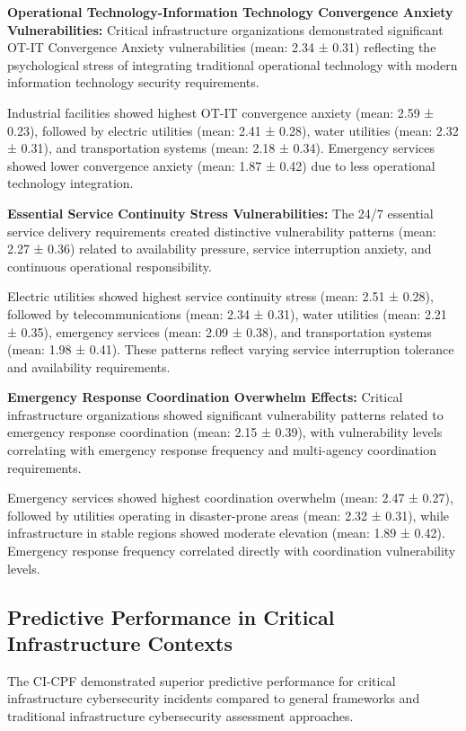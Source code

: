 \documentclass[10pt, twocolumn]{article}
\begin{document}
\textbf{Operational Technology-Information Technology Convergence Anxiety Vulnerabilities:} Critical infrastructure organizations demonstrated significant OT-IT Convergence Anxiety vulnerabilities (mean: 2.34 ± 0.31) reflecting the psychological stress of integrating traditional operational technology with modern information technology security requirements.

Industrial facilities showed highest OT-IT convergence anxiety (mean: 2.59 ± 0.23), followed by electric utilities (mean: 2.41 ± 0.28), water utilities (mean: 2.32 ± 0.31), and transportation systems (mean: 2.18 ± 0.34). Emergency services showed lower convergence anxiety (mean: 1.87 ± 0.42) due to less operational technology integration.

\textbf{Essential Service Continuity Stress Vulnerabilities:} The 24/7 essential service delivery requirements created distinctive vulnerability patterns (mean: 2.27 ± 0.36) related to availability pressure, service interruption anxiety, and continuous operational responsibility.

Electric utilities showed highest service continuity stress (mean: 2.51 ± 0.28), followed by telecommunications (mean: 2.34 ± 0.31), water utilities (mean: 2.21 ± 0.35), emergency services (mean: 2.09 ± 0.38), and transportation systems (mean: 1.98 ± 0.41). These patterns reflect varying service interruption tolerance and availability requirements.

\textbf{Emergency Response Coordination Overwhelm Effects:} Critical infrastructure organizations showed significant vulnerability patterns related to emergency response coordination (mean: 2.15 ± 0.39), with vulnerability levels correlating with emergency response frequency and multi-agency coordination requirements.

Emergency services showed highest coordination overwhelm (mean: 2.47 ± 0.27), followed by utilities operating in disaster-prone areas (mean: 2.32 ± 0.31), while infrastructure in stable regions showed moderate elevation (mean: 1.89 ± 0.42). Emergency response frequency correlated directly with coordination vulnerability levels.

\subsection{Predictive Performance in Critical Infrastructure Contexts}

The CI-CPF demonstrated superior predictive performance for critical infrastructure cybersecurity incidents compared to general frameworks and traditional infrastructure cybersecurity assessment approaches.
\end{document}
